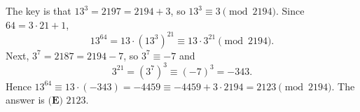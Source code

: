 The key is that $13^3=2197=2194+3$, so $13^3\equiv3\pmod{2194}$. Since $64=3\cdot21+1$,
\[13^{64}=13\cdot\left(13^3\right)^{21}\equiv13\cdot3^{21}\pmod{2194}.\]
Next, $3^7=2187=2194-7$, so $3^7\equiv-7$ and
\[3^{21}=\left(3^7\right)^3\equiv(-7)^3=-343 .\]
Hence $13^{64}\equiv13\cdot(-343)=-4459\equiv-4459+3\cdot2194=2123\pmod{2194}$. The answer is $\boxed{\textbf{(E) } 2123}$.
